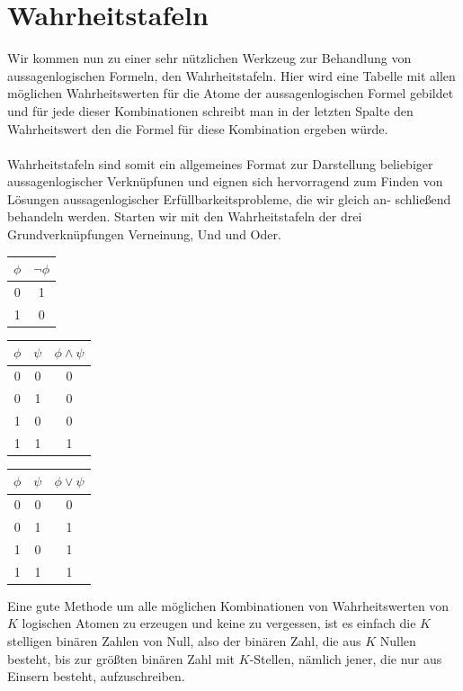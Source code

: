 \documentclass[11pt,a4paper,leqno]{report}
\numberwithin{equation}{chapter}
\begin{document}
\section{Wahrheitstafeln}
Wir kommen nun zu einer sehr n\"utzlichen Werkzeug zur Behandlung von aussagenlogischen Formeln, den Wahrheitstafeln. Hier wird eine Tabelle mit allen m\"oglichen Wahrheitswerten f\"ur die Atome der aussagenlogischen Formel gebildet und f\"ur jede dieser Kombinationen schreibt man in der letzten Spalte den Wahrheitswert den die Formel f\"ur diese Kombination ergeben w\"urde.\\
\\
Wahrheitstafeln sind somit ein allgemeines Format zur Darstellung beliebiger aussagenlogischer Verkn\"upfunen und eignen sich hervorragend zum Finden von L\"osungen aussagenlogischer Erf\"ullbarkeitsprobleme, die wir gleich an- schlie\ss{}end behandeln werden.
Starten wir mit den Wahrheitstafeln der drei Grundverkn\"upfungen Verneinung, Und und Oder.
\begin{center}
\begin{minipage}{1.0in}
	\begin{tabular}{|c|c|}
	$\phi$ & $\neg\phi$\\
	\hline
	0 & 1\\
	1 & 0\\
	\end{tabular}
\end{minipage}
\begin{minipage}{1.5in}
	\begin{tabular}{|c c|c|}
	$\phi$ & $\psi$ & $\phi \wedge \psi$\\
	\hline
	0 & 0 & 0\\
	0 & 1 & 0\\
	1 & 0 & 0\\
	1 & 1 & 1\\
	\end{tabular}  
\end{minipage}
\begin{minipage}{1.5in}
	\begin{tabular}{|c c|c|}
	$\phi$ & $\psi$ & $\phi \vee \psi$\\
	\hline
	0 & 0 & 0\\
	0 & 1 & 1\\
	1 & 0 & 1\\
	1 & 1 & 1\\
	\end{tabular}  
\end{minipage}
\end{center}
Eine gute Methode um alle m\"oglichen Kombinationen von Wahrheitswerten von $K$ logischen Atomen zu erzeugen und keine zu vergessen, ist es einfach die $K$ stelligen bin\"aren Zahlen von Null, also der bin\"aren Zahl, die aus $K$ Nullen besteht, bis zur gr\"o\ss{}ten bin\"aren Zahl mit $K$-Stellen, n\"amlich jener, die nur aus Einsern besteht, aufzuschreiben.\\
\end{document}

